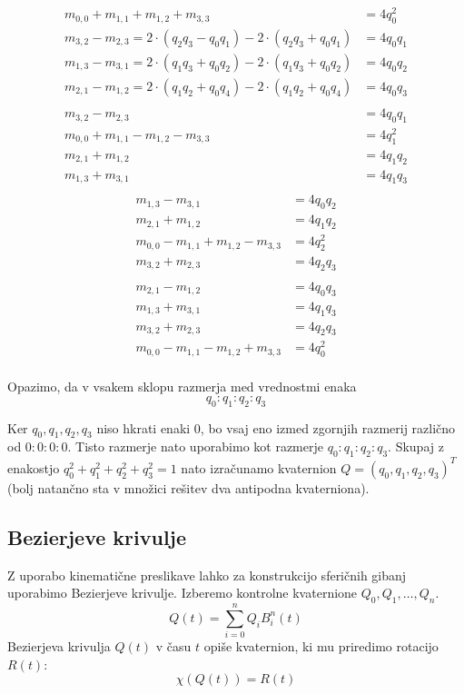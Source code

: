 \documentclass[12pt,a4paper,twoside]{article}
\theoremstyle{definition} %
\theoremstyle{plain} %
\numberwithin{equation}{section}  %
\begin{document}
\begin{align*}
m_{0,0} + m_{1,1} + m_{1,2} + m_{3,3} &= 4 q_0^2 \\
m_{3,2} - m_{2,3} = 2 \cdot (q_2 q_3 - q_0 q_1) - 2 \cdot (q_2 q_3 + q_0 q_1) &= 4 q_0 q_1 \\
m_{1,3} - m_{3,1} = 2 \cdot (q_1 q_3 + q_0 q_2) - 2 \cdot (q_1 q_3 + q_0 q_2) &= 4 q_0 q_2 \\
m_{2,1} - m_{1,2} = 2 \cdot (q_1 q_2 + q_0 q_4) - 2 \cdot (q_1 q_2 + q_0 q_4) &= 4 q_0 q_3 \\
& \\
m_{3,2} - m_{2,3} & = 4 q_0 q_1 \\
m_{0,0} + m_{1,1} - m_{1,2} - m_{3,3} &= 4 q_1^2 \\
m_{2,1} + m_{1,2} &= 4 q_1 q_2 \\
m_{1,3} + m_{3,1} &= 4 q_1 q_3 \\
\end{align*}
\begin{align*}
m_{1,3} - m_{3,1} &= 4 q_0 q_2 \\
m_{2,1} + m_{1,2} &= 4 q_1 q_2 \\
m_{0,0} - m_{1,1} + m_{1,2} - m_{3,3} &= 4 q_2^2 \\
m_{3,2} + m_{2,3} &= 4 q_2 q_3 \\
& \\
m_{2,1} - m_{1,2} &= 4 q_0 q_3 \\
m_{1,3} + m_{3,1} &= 4 q_1 q_3 \\
m_{3,2} + m_{2,3} &= 4 q_2 q_3 \\
m_{0,0} - m_{1,1} - m_{1,2} + m_{3,3} &= 4 q_0^2 \\
\end{align*}

\noindent Opazimo, da v vsakem sklopu razmerja med vrednostmi enaka
$$ q_0 : q_1 : q_2 : q_3 $$

\noindent Ker $q_0,q_1,q_2,q_3$ niso hkrati enaki $0$, bo vsaj eno izmed zgornjih razmerij različno od $0 : 0 : 0 : 0$. Tisto razmerje nato uporabimo kot razmerje $ q_0 : q_1 : q_2 : q_3 $. Skupaj z enakostjo $q_0^2 + q_1^2 + q_2^2 + q_3^2 = 1$ nato izračunamo kvaternion $Q=(q_0,q_1,q_2,q_3)^T$ (bolj natančno sta v množici rešitev dva antipodna kvaterniona).
\subsection{Bezierjeve krivulje}
\noindent Z uporabo kinematične preslikave lahko za konstrukcijo sferičnih gibanj uporabimo Bezierjeve krivulje. Izberemo kontrolne kvaternione $Q_0,Q_1,\dots,Q_n$.
$$Q(t) = \sum\limits_{i=0}^{n} Q_i B_i^n(t)$$
\noindent Bezierjeva krivulja $Q(t)$ v času $t$ opiše kvaternion, ki mu priredimo rotacijo $R(t)$:
$$\chi(Q(t)) = R(t)$$
\end{document}

